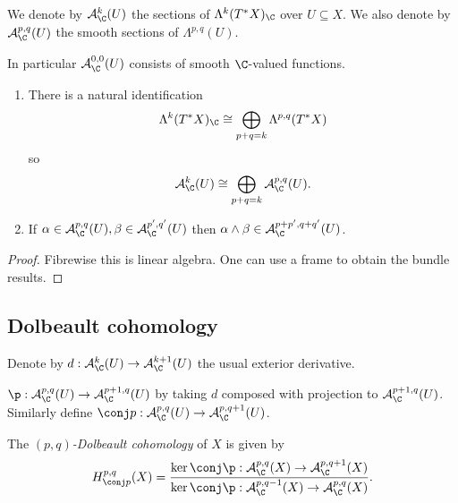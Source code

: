 \documentclass[a4paper]{article}
\newcommand{\w}{\wedge} %
\begin{document}
\begin{definition}
  We denote by \(\mathcal A_\C^k(U)\) the sections of \(\Lambda^k(T^*X)_\C\) over \(U \subseteq X\). We also denote by \(\mathcal A_\C^{p, q}(U)\) the smooth sections of \(\Lambda^{p, q}(U)\).
\end{definition}
In particular \(\mathcal A_\C^{0, 0}(U)\) consists of smooth \(\C\)-valued functions.

\begin{lemma}\leavevmode
  \begin{enumerate}
  \item There is a natural identification
    \[
      \Lambda^k(T^*X)_\C \cong \bigoplus_{p + q = k} \Lambda^{p, q} (T^*X)
    \]
    so
    \[
      \mathcal A_\C^k(U) \cong \bigoplus_{p + q = k} \mathcal A_\C^{p, q} (U).
    \]
  \item If \(\alpha \in \mathcal A_\C^{p, q}(U), \beta \in \mathcal A_\C^{p', q'}(U)\) then \(\alpha \w \beta \in \mathcal A_\C^{p + p', q + q'}(U)\).
  \end{enumerate}
\end{lemma}

\begin{proof}
  Fibrewise this is linear algebra. One can use a frame to obtain the bundle results.
\end{proof}

\subsection{Dolbeault cohomology}

Denote by \(d: \mathcal A_\C^k(U) \to \mathcal A_\C^{k + 1}(U)\) the usual exterior derivative.

\begin{definition}
  \(\p: \mathcal A_\C^{p, q}(U) \to \mathcal A_\C^{p + 1, q}(U)\) by taking \(d\) composed with projection to \(\mathcal A_\C^{p + 1, q}(U)\). Similarly define \(\conj p: \mathcal A_\C^{p, q}(U) \to \mathcal A_\C^{p, q + 1}(U)\).
\end{definition}

\begin{definition}
  The \emph{\((p, q)\)-Dolbeault cohomology} of \(X\) is given by
  \[
    H_{\conj p}^{p, q}(X) = \frac{\ker \conj \p: \mathcal A_\C^{p, q}(X) \to \mathcal A_\C^{p, q + 1}(X)}{\ker \conj \p: \mathcal A_\C^{p, q - 1}(X) \to \mathcal A_\C^{p, q}(X)}.
  \]
\end{definition}






\printindex
\end{document}
